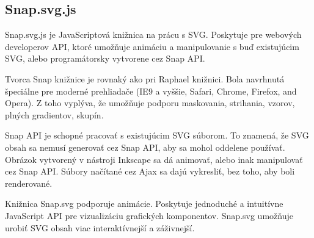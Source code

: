 \subsection{Snap.svg.js}

Snap.svg.js je JavaScriptová knižnica na prácu s SVG. Poskytuje pre webových developerov \acs{API}, ktoré umožňuje animáciu a manipulovanie s buď existujúcim SVG, alebo programátorsky vytvorene cez Snap API. 

%

Tvorca Snap knižnice je rovnaký ako pri Raphael knižnici.  Bola navrhnutá špeciálne pre moderné prehliadače (IE9 a vyššie, Safari, Chrome, Firefox, and Opera). Z toho vyplýva, že umožňuje podporu maskovania, strihania, vzorov, plných gradientov, skupín. 

Snap API je schopné pracovať s existujúcim SVG súborom. To znamená, že SVG obsah sa nemusí  generovať cez Snap API, aby sa mohol oddelene používať. Obrázok vytvorený v nástroji  Inkscape sa dá animovať, alebo inak manipulovať cez Snap API.
Súbory načítané cez Ajax sa dajú vykresliť, bez toho, aby boli renderované. 


Knižnica Snap.svg podporuje animácie. Poskytuje jednoduché a intuitívne JavaScript API pre vizualizáciu grafických komponentov. Snap.svg umožňuje urobiť SVG obsah viac interaktívnejší a záživnejší. \cite{snapsvg}



